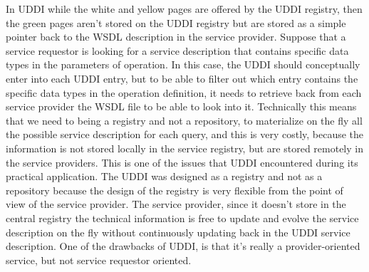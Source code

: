 In UDDI while the white and yellow pages are offered by the UDDI registry, then the green pages aren't stored on the UDDI registry but are stored as a simple pointer back to the WSDL description in the service provider.
Suppose that a service requestor is looking for a service description that contains specific data types in the parameters of operation.
In this case, the UDDI should conceptually enter into each UDDI entry, but to be able to filter out which entry contains the specific data types in the operation definition, it needs to retrieve back from each service provider the WSDL file to be able to look into it.
Technically this means that we need to being a registry and not a repository, to materialize on the fly all the possible service description for each query, and this is very costly, because the information is not stored locally in the service registry, but are stored remotely in the service providers.
This is one of the issues that UDDI encountered during its practical application.
The UDDI was designed as a registry and not as a repository because the design of the registry is very flexible from the point of view of the service provider.
The service provider, since it doesn't store in the central registry the technical information is free to update and evolve the service description on the fly without continuously updating back in the UDDI service description. One of the drawbacks of UDDI, is that it's really a provider-oriented service, but not service requestor oriented.

